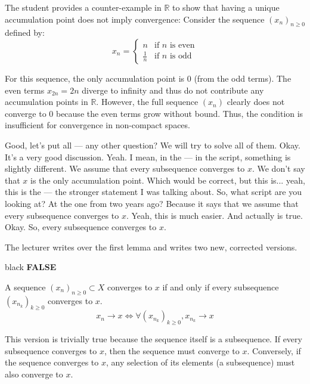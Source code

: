 \begin{math-stroke}
The student provides a counter-example in $\mathbb{R}$ to show that having a unique accumulation point does not imply convergence:
Consider the sequence $(x_n)_{n \ge 0}$ defined by:
\[
x_n = \begin{cases} 
n & \text{if } n \text{ is even} \\
\frac{1}{n} & \text{if } n \text{ is odd}
\end{cases}
\]
\begin{explanation-of-steps}
For this sequence, the only accumulation point is $0$ (from the odd terms). The even terms $x_{2n} = 2n$ diverge to infinity and thus do not contribute any accumulation points in $\mathbb{R}$. However, the full sequence $(x_n)$ clearly does not converge to $0$ because the even terms grow without bound. Thus, the condition  is insufficient for convergence in non-compact spaces.
\end{explanation-of-steps}
\end{math-stroke}

\begin{spoken-clean}[00:11:24 - 00:13:40]
Good, let's put all — any other question? We will try to solve all of them. Okay. It's a very good discussion. Yeah. I mean, in the — in the script, something is slightly different. We assume that every subsequence converges to $x$. We don't say that $x$ is the only accumulation point. Which would be correct, but this is... yeah, this is the — the stronger statement I was talking about. So, what script are you looking at? At the one from two years ago? Because it says that we assume that every subsequence converges to $x$. Yeah, this is much easier. And actually is true. Okay. So, every subsequence converges to $x$.
\end{spoken-clean}

\begin{nice-box}
The lecturer writes  over the first lemma and writes two new, corrected versions.
\end{nice-box}
\begin{color-box}{black}
\textbf{FALSE}
\end{color-box}
\begin{math-stroke}
\begin{lemma}\label{lem:convergence-acc-point-v2}
A sequence $(x_n)_{n \ge 0} \subset X$ converges to $x$ if and only if every subsequence $(x_{n_k})_{k \ge 0}$ converges to $x$.
\[ x_n \to x \iff \forall (x_{n_k})_{k \ge 0}, x_{n_k} \to x \]
\end{lemma}

\begin{explanation-of-steps}
This version is trivially true because the sequence itself is a subsequence. If every subsequence converges to $x$, then the sequence must converge to $x$. Conversely, if the sequence converges to $x$, any selection of its elements (a subsequence) must also converge to $x$.
\end{explanation-of-steps}
\end{math-stroke}

